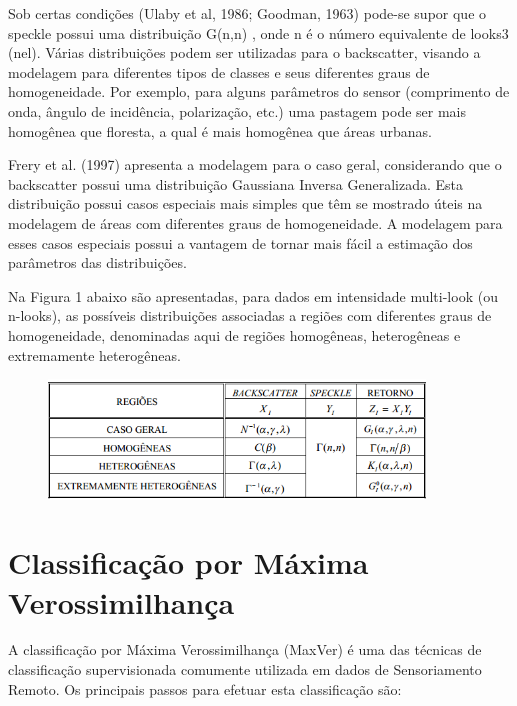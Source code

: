 \documentclass[a4paper, 12pt, english]{article}
\begin{document}
Sob certas condições (Ulaby et al, 1986; Goodman, 1963) pode-se supor que o speckle
possui uma distribuição G(n,n) , onde n é o número equivalente de looks3 (nel). Várias
distribuições podem ser utilizadas para o backscatter, visando a modelagem para diferentes
tipos de classes e seus diferentes graus de homogeneidade. Por exemplo, para alguns
parâmetros do sensor (comprimento de onda, ângulo de incidência, polarização, etc.) uma
pastagem pode ser mais homogênea que floresta, a qual é mais homogênea que áreas
urbanas.

Frery et al. (1997) apresenta a modelagem para o caso geral, considerando que
o backscatter possui uma distribuição Gaussiana Inversa Generalizada. Esta distribuição
possui casos especiais mais simples que têm se mostrado úteis na modelagem de áreas
com diferentes graus de homogeneidade. A modelagem para esses casos especiais possui
a vantagem de tornar mais fácil a estimação dos parâmetros das distribuições.

Na Figura 1 abaixo são apresentadas, para dados em intensidade multi-look (ou n-looks), as
possíveis distribuições associadas a regiões com diferentes graus de homogeneidade,
denominadas aqui de regiões homogêneas, heterogêneas e extremamente heterogêneas.

 \begin{figure}[!ht]
 			\begin{center}
				\includegraphics[width=100mm,scale=0.5]{tabela.png}
			\end{center}
       		\caption{\label{Retorno em intensidade para N - Looks}}
 \end{figure}


\section{Classificação por Máxima Verossimilhança}

A classificação por Máxima Verossimilhança (MaxVer) é uma das técnicas de
classificação supervisionada comumente utilizada em dados de Sensoriamento Remoto.
Os principais passos para efetuar esta classificação são:
\end{document}
